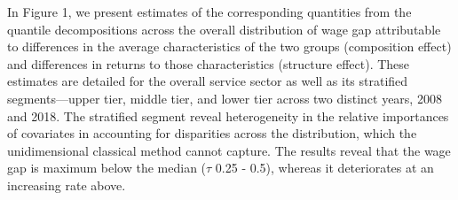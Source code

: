 In Figure 1, we present estimates of the corresponding quantities from the quantile decompositions across the overall distribution of wage gap attributable to differences in the average characteristics of the two groups (composition effect) and differences in returns to those characteristics (structure effect). These estimates are detailed for the overall service sector as well as its stratified segments—upper tier, middle tier, and lower tier across two distinct years, 2008 and 2018. The stratified segment reveal heterogeneity in the relative importances of covariates in accounting for disparities across the distribution, which the unidimensional classical method cannot capture. The results reveal that the wage gap is maximum below the median ($\tau$ 0.25 - 0.5), whereas it deteriorates at an increasing rate above.  



 